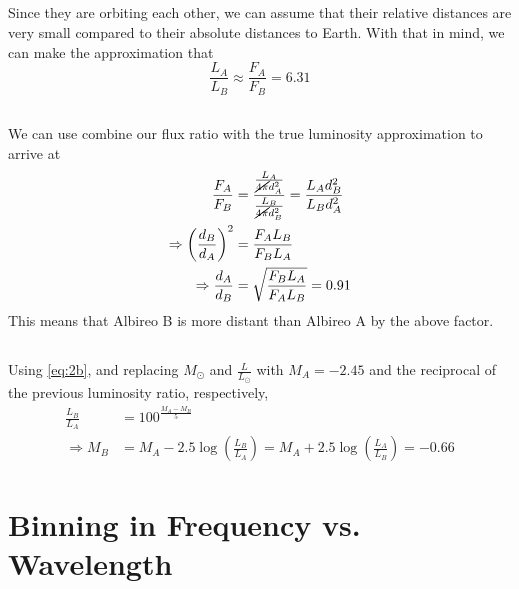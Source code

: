 \documentclass{article}
\begin{document}
\subsection{}

Since they are orbiting each other, we can assume that their relative distances are very small compared to their absolute distances to Earth.
With that in mind, we can make the approximation that
\begin{equation}
    \frac{L_A}{L_B} \approx \frac{F_A}{F_B} = \num{6.31}
\end{equation}

\subsection{}

We can use combine our flux ratio with the true luminosity approximation to arrive at
\begin{align}
    \frac{F_A}{F_B} &= \frac{\frac{L_A}{\cancel{4 \pi} d_A^2}}{\frac{L_B}{\cancel{4 \pi} d_B^2}} = \frac{L_A d_B^2}{L_B d_A^2} \\
    \Rightarrow \left(\frac{d_B}{d_A}\right)^2 &= \frac{F_A L_B}{F_B L_A} \\
    \Rightarrow \frac{d_A}{d_B} &= \sqrt{\frac{F_B L_A}{F_A L_B}} = \num{0.91}
\end{align}
This means that Albireo B is more distant than Albireo A by the above factor.

\subsection{}

Using \autoref{eq:2b}, and replacing \(M_\odot\) and \(\frac{L}{L_\odot}\) with \(M_A = \num{-2.45}\) and the reciprocal of the previous luminosity ratio, respectively,
\begin{align}
    \frac{L_B}{L_A} &= 100^{\frac{M_A - M_B}{5}} \\
    \Rightarrow M_B &= M_A - 2.5 \log\left(\frac{L_B}{L_A}\right) = M_A + 2.5 \log\left(\frac{L_A}{L_B}\right) = \num{-0.66}
\end{align}

\section{Binning in Frequency vs. Wavelength}

\subsection{}
\end{document}
